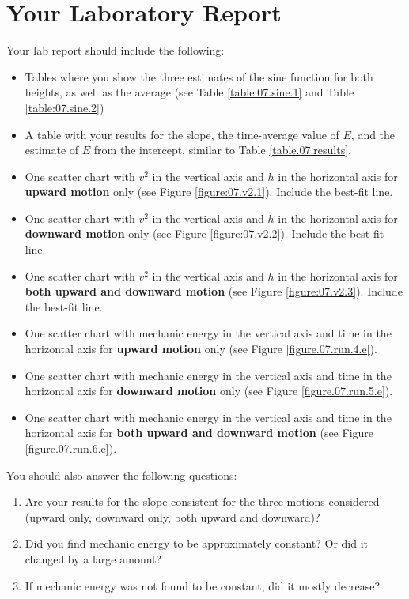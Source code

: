 \section{Your Laboratory Report}
Your lab report should include the following:
\begin{itemize}
    \item Tables where you show the three estimates of the sine function for both heights, as well as the average (see Table \ref{table:07.sine.1} and Table \ref{table:07.sine.2})
    \item A table with your results for the slope, the time-average value of $E$, and the estimate of $E$ from the intercept, similar to Table \ref{table.07.results}.
    \item One scatter chart with $v^{2}$ in the vertical axis and $h$ in the horizontal axis for \textbf{upward motion} only (see Figure \ref{figure:07.v2.1}). Include the best-fit line.
    \item One scatter chart with $v^{2}$ in the vertical axis and $h$ in the horizontal axis for \textbf{downward motion} only (see Figure \ref{figure:07.v2.2}). Include the best-fit line.
    \item One scatter chart with $v^{2}$ in the vertical axis and $h$ in the horizontal axis for \textbf{both upward and downward motion} (see Figure \ref{figure:07.v2.3}). Include the best-fit line.
    \item One scatter chart with mechanic energy in the vertical axis and time in the horizontal axis for \textbf{upward motion} only (see Figure \ref{figure.07.run.4.e}).
    \item One scatter chart with mechanic energy in the vertical axis and time in the horizontal axis for \textbf{downward motion} only (see Figure \ref{figure.07.run.5.e}).
    \item One scatter chart with mechanic energy in the vertical axis and time in the horizontal axis for \textbf{both upward and downward motion} (see Figure \ref{figure.07.run.6.e}).
\end{itemize}
You should also answer the following questions:
\begin{enumerate}
    \item Are your results for the slope consistent for the three motions considered (upward only, downward only, both upward and downward)?
    \item Did you find mechanic energy to be approximately constant? Or did it changed by a large amount?
    \item If mechanic energy was not found to be constant, did it mostly decrease?
\end{enumerate}
\FloatBarrier
\newpage
